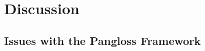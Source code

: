 \documentclass[%
 reprint,
 amsmath,amssymb,
 aps,nofootinbib
]{revtex4-1}
\begin{document}
\section{Discussion}


\subsection{Issues with the Pangloss Framework}


\end{document}
